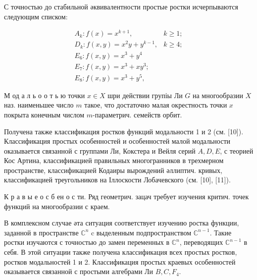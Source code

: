 \documentclass[10pt]{article}
\begin{document}
С точностью до стабильной әквивалентности простые ростки исчерпываются следующим списком:



\[

\begin{array}{ll}

A_{k}: f(x)=x^{k+1}, & k \geqslant 1 ; \\

D_{k}: f(x, y)=x^{2} y+y^{k-1}, & k \geqslant 4 ; \\

E_{6}: f(x, y)=x^{3}+y^{4} & \\

E_{7}: f(x, y)=x^{3}+x y^{3} ; & \\

E_{8}: f(x, y)=x^{3}+y^{5}, &

\end{array}

\]



М од а л ь о о т ь ю точки $x \in X$ шри действии групіы Ли $G$ на многообразии $X$ наз. наименьшее число $m$ такое, что достаточно малая окрестность точки $x$ покрыта конечным числом $m$-параметрич. семейств орбит.



Получена также классификация ростков функций модальности 1 и 2 (см. [10]). Классификация простых особенностей и особенностей малой модальности оказывается связанной с группами Ли, Кокстера и Вейля серий $A, D, E$, с теорией Кос Артина, классификацией правильных многогранников в трехмерном пространстве, классификацией Кодаиры вырождений әллиптич. кривых, классификацией треугольников на Іллоскости Лобачевского (см. [10], [11]).



К р а в ы е о с б ен о с ти. Ряд геометрич. зацач требует изучения критич. точек функций на многообразии с краем.



В комплексном случае әта ситуация соответствует изучению ростка функции, заданной в пространстве $\mathbb{C}^{n}$ c выделенным подпространством $\mathbb{C}^{n-1}$. Такие ростки изучаются с точностью до замен переменных в $\mathbb{C}^{n}$, переводящих $\mathbb{C}^{n-1}$ в себя. В этой ситуации также получена классификация всех простых ростков, ростков модальностей 1 и 2. Классификация простых краевых особенностей оказывается связанной с простыми алгебрами Ли $B, C, F_{4}$.
\end{document}

